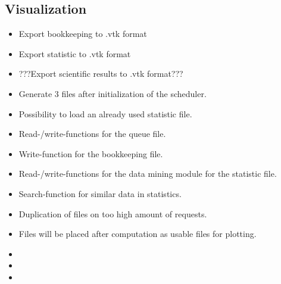 {		
	\subsection{Visualization}
	
		\begin{itemize}
			\item Export bookkeeping to .vtk format
			\item Export statistic to .vtk format
			\item ???Export scientific results to .vtk format??? 
		\end{itemize}

	\begin{itemize}
		\item Generate 3 files after initialization of the scheduler.
		\item Possibility to load an already used statistic file.
		\item Read-/write-functions for the queue file.
		\item Write-function for the bookkeeping file.
		\item Read-/write-functions for the data mining module for the statistic file.
		\item Search-function for similar data in statistics.
		\item Duplication of files on too high amount of requests.
		\item Files will be placed after computation as usable files for plotting.
		\item 
		\item
		\item 
	\end{itemize}
}